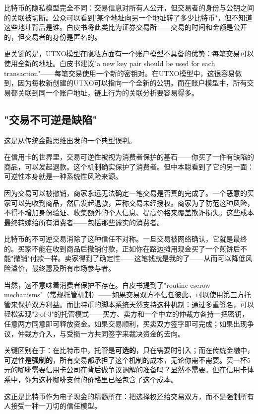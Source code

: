 \documentclass[a4paper,12pt,openany]{ctexbook}
\begin{document}
比特币的隐私模型完全不同：交易信息对所有人公开，但交易者的身份与公钥之间的关联被切断。公众可以看到"某个地址向另一个地址转了多少比特币"，但不知道这些地址背后是谁。白皮书将此类比为证券交易所——交易的时间和金额是公开的，但交易者的身份是匿名的。

更关键的是，UTXO模型在隐私方面有一个账户模型不具备的优势：每笔交易可以使用全新的地址。白皮书建议"a new key pair should be used for each transaction"——每笔交易使用一个新的密钥对。在UTXO模型中，这很容易做到，因为每枚新创建的UTXO可以指向一个全新的公钥。而在账户模型中，所有交易都关联到同一个账户地址，链上行为的关联分析要容易得多。


\subsection*{"交易不可逆是缺陷"}


这是从传统金融思维出发的一个典型误判。

在信用卡的世界里，交易可逆性被视为消费者保护的基石——你买了一件有缺陷的商品，可以发起退款。这个机制确实保护了消费者。但中本聪看到了它的另一面：可逆性本身就是一种系统性风险来源。

因为交易可以被撤销，商家永远无法确定一笔交易是否真的完成了。一个恶意的买家可以先收到商品，然后发起退款，声称交易未经授权。商家为了防范这种风险，不得不增加身份验证、收集额外的个人信息、提高价格来覆盖欺诈损失。这些成本最终转嫁给所有消费者——包括那些诚实的消费者。

比特币的不可逆交易消除了这种信任不对称。一旦交易被网络确认，它就是最终的。买家不能在收到商品后撤销付款，正如你在路边摊用现金买了一个煎饼后不能"撤销"付款一样。卖家得到了确定性——这笔钱就是我的了——从而可以降低风险溢价，最终惠及所有市场参与者。

当然，这不意味着消费者保护不存在。白皮书提到了"routine escrow mechanisms"（常规托管机制）——如果交易双方不信任彼此，可以使用第三方托管来保护双方利益。而比特币的脚本系统天然支持这种机制：通过多重签名，可以轻松实现"2-of-3"的托管模式——买方、卖方和一个中立的仲裁方各持一把密钥，任意两方同意即可释放资金。如果交易顺利，买卖双方签字即可完成；如果出现争议，仲裁方介入，与受损一方共同签字来裁决资金的去向。

关键区别在于：在比特币中，托管是\textbf{可选的}，只在需要时引入；而在传统金融中，可逆性是\textbf{强制的}，所有交易都承担了这个机制的成本，无论你需不需要。买一杯5元的咖啡需要信用卡公司在背后做争议调解的准备吗？显然不需要。但在信用卡体系中，你为这杯咖啡支付的价格里已经包含了这个成本。

这正是比特币作为电子现金的精髓所在：把选择权还给交易双方，而不是强制所有人接受一种一刀切的信任模型。
\end{document}
